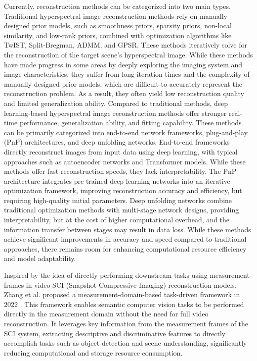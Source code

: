 \documentclass[preprint,review,12pt]{elsarticle}
\begin{document}
Currently, reconstruction methods can be categorized into two main types. Traditional hyperspectral image reconstruction methods rely on manually designed prior models, such as smoothness priors, sparsity priors, non-local similarity, and low-rank priors, combined with optimization algorithms like TwIST, Split-Bregman, ADMM, and GPSR. These methods iteratively solve for the reconstruction of the target scene's hyperspectral image. While these methods have made progress in some areas by deeply exploring the imaging system and image characteristics, they suffer from long iteration times and the complexity of manually designed prior models, which are difficult to accurately represent the reconstruction problem. As a result, they often yield low reconstruction quality and limited generalization ability. Compared to traditional methods, deep learning-based hyperspectral image reconstruction methods offer stronger real-time performance, generalization ability, and fitting capability. These methods can be primarily categorized into end-to-end network frameworks, plug-and-play (PnP) architectures, and deep unfolding networks. End-to-end frameworks directly reconstruct images from input data using deep learning, with typical approaches such as autoencoder networks and Transformer models. While these methods offer fast reconstruction speeds, they lack interpretability. The PnP architecture integrates pre-trained deep learning networks into an iterative optimization framework, improving reconstruction accuracy and efficiency, but requiring high-quality initial parameters. Deep unfolding networks combine traditional optimization methods with multi-stage network designs, providing interpretability, but at the cost of higher computational overhead, and the information transfer between stages may result in data loss. While these methods achieve significant improvements in accuracy and speed compared to traditional approaches, there remains room for enhancing computational resource efficiency and model adaptability.

Inspired by the idea of directly performing downstream tasks using measurement frames in video SCI (Snapshot Compressive Imaging) reconstruction models, Zhang et al. proposed a measurement-domain-based task-driven framework in 2022 \cite{zhang2022}. This framework enables semantic computer vision tasks to be performed directly in the measurement domain without the need for full video reconstruction. It leverages key information from the measurement frames of the SCI system, extracting descriptive and discriminative features to directly accomplish tasks such as object detection and scene understanding, significantly reducing computational and storage resource consumption.
\end{document}
